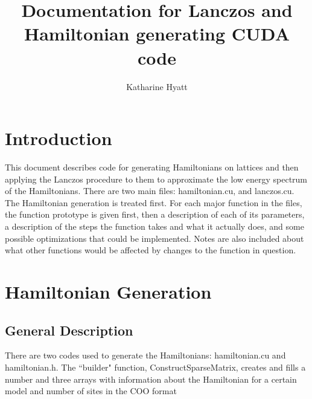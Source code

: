 \documentclass{article}
\author{Katharine Hyatt}
\title{Documentation for Lanczos and Hamiltonian generating CUDA code}
\begin{document}
\renewcommand{\int}{\textcolor{Green}{int $\,$}}
\newcommand{\const}{\textcolor{Green}{const $\,$}}
\renewcommand{\long}{\textcolor{Green}{long $\,$}}
\newcommand{\double}{\textcolor{Green}{double $\,$}}
\newcommand{\typelongptr}{\textcolor{Green}{long$^\ast \,$}}
\newcommand{\void}{\textcolor{Green}{void $\,$}}
\newcommand{\typelongtwoptr}{\textcolor{Green}{long2$^\ast \,$}}
\newcommand{\cuDoubleComplex}{\textcolor{Green}{cuDoubleComplex$^\ast \,$}}
\newcommand{\hamstruct}{\textcolor{Green}{hamstruct$^\ast \,$}}
\newcommand{\host}{\textcolor{Red}{$\_\_$host$\_\_ \; \;$}}
\newcommand{\cudaglobal}{\textcolor{Red}{$\_\_$global$\_\_ \; \;$}}
\newcommand{\device}{\textcolor{Red}{$\_\_$device$\_\_ \; \;$}}

\maketitle

\section{Introduction}

This document describes code for generating Hamiltonians on lattices and then applying the Lanczos procedure to them to approximate the low energy spectrum of the Hamiltonians. There are two main files: hamiltonian.cu, and lanczos.cu. The Hamiltonian generation is treated first. For each major function in the files, the function prototype is given first, then a description of each of its parameters, a description of the steps the function takes and what it actually does, and some possible optimizations that could be implemented. Notes are also included about what other functions would be affected by changes to the function in question.

\section{Hamiltonian Generation}

\subsection{General Description}

There are two codes used to generate the Hamiltonians: hamiltonian.cu and hamiltonian.h. The ``builder" function, ConstructSparseMatrix, creates and fills a number and three arrays with information about the Hamiltonian for a certain model and number of sites in the COO format
\end{document}
